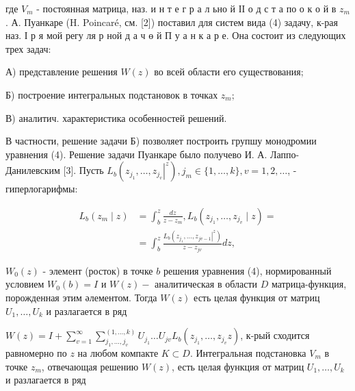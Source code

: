 \documentclass[10pt]{article}
\begin{document}
где $V_{m}$ - постоянная матрица, наз. и н т е г р а л ьно й ІІ о д с т а по о к о й в $z_{m}$. А. Пуанкаре (H. Poincaré, см. [2]) поставил для систем вида (4) задачу, к-рая наз. І р я мой регу ля р ной д а ч ө й П у а н к а р е. Она состоит из следующих трех задач:



А) представление решения $W(z)$ во всей области его существования;



Б) построение интегральных подстановок в точках $z_{m} ;$



В) аналитич. характеристика особенностей решений.



В частности, решение задачи Б) позволяет построить групшу монодромии уравнения (4). Решение задачи Пуанкаре было получево И. А. Лаппо-Данилевским [3]. Пусть $L_{b}\left(z_{j_{1}}, \ldots,\left.z_{j_{v}}\right|^{z}\right), j_{m} \in\{1, \ldots, k\}, v=1,2, \ldots$, - гиперлогарифмы:



\[

\begin{aligned}

L_{b}\left(z_{m} \mid z\right) & =\int_{b}^{z} \frac{d z}{z-z_{m}}, L_{b}\left(z_{j_{1}}, \ldots, z_{j_{v}} \mid z\right)= \\

& =\int_{b}^{z} \frac{L_{b}\left(z_{j_{1}}, \ldots,\left.z_{j v-1}\right|^{z}\right)}{z-z_{j v}} d z,

\end{aligned}

\]



$W_{0}(z)$ - элемент (росток) в точке $b$ решения уравнения (4), нормированный условием $W_{0}(b)=I$ и $W(z)-$ аналитическая в области $D$ матрица-функция, порожденная этим әлементом. Тогда $W(z)$ есть целая функция от матриц $U_{1}, \ldots, U_{k}$ и разлагается в ряд



$W(z)=I+\sum_{v=1}^{\infty} \sum_{j_{1}, \ldots, j_{v}}^{(1, \ldots, k)} U_{j_{1}} \ldots U_{j v} L_{b}\left(z_{j_{1}}, \ldots, z_{j_{v}} z\right)$, к-рый сходится равномерно по $z$ на любом компакте $K \subset D$. Интегральная подстановка $V_{m}$ в точке $z_{m}$, отвечающая решению $W(z)$, есть целая функция от матриц $U_{1}, \ldots, U_{k}$ и разлагается в ряд
\end{document}
